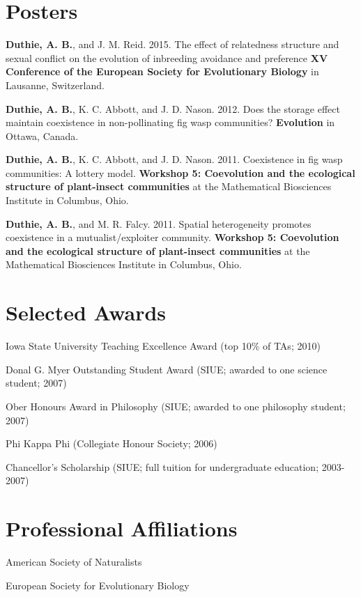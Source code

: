 \documentclass[letterpaper]{article}
\renewenvironment{itemize}{
  \begin{list}{}{
    \setlength{\leftmargin}{1.5em}
  }
}{
  \end{list}
}
\begin{document}
\section*{Posters}
\begin{itemize}
\item {\bf Duthie, A. B.}, and J. M. Reid. 2015. The effect of relatedness structure and sexual conflict on the evolution of inbreeding avoidance and preference {\bf XV Conference of the European Society for Evolutionary Biology} in Lausanne, Switzerland.
\item {\bf Duthie, A. B.}, K. C. Abbott, and J. D. Nason. 2012. Does the storage effect maintain coexistence in non-pollinating fig wasp communities? {\bf Evolution} in Ottawa, Canada.
\item {\bf Duthie, A. B.}, K. C. Abbott, and J. D. Nason. 2011. Coexistence in fig wasp communities: A lottery model. {\bf Workshop 5: Coevolution and the ecological structure of plant-insect communities} at the Mathematical Biosciences Institute in Columbus, Ohio.
\item {\bf Duthie, A. B.}, and M. R. Falcy. 2011. Spatial heterogeneity promotes coexistence in a mutualist/exploiter community. {\bf Workshop 5: Coevolution and the ecological structure of plant-insect communities} at the Mathematical Biosciences Institute in Columbus, Ohio.
\end{itemize}

\section*{Selected Awards}
\begin{itemize}
\item Iowa State University Teaching Excellence Award (top 10\% of TAs; 2010)
\item Donal G. Myer Outstanding Student Award (SIUE; awarded to one science student; 2007)
\item Ober Honours Award in Philosophy (SIUE; awarded to one philosophy student; 2007)
\item Phi Kappa Phi (Collegiate Honour Society; 2006)
\item Chancellor's Scholarship (SIUE; full tuition for undergraduate education; 2003-2007)
\end{itemize}

\section*{Professional Affiliations}
\begin{itemize}
\item American Society of Naturalists%
\item European Society for Evolutionary Biology
\end{itemize}
\end{document}
